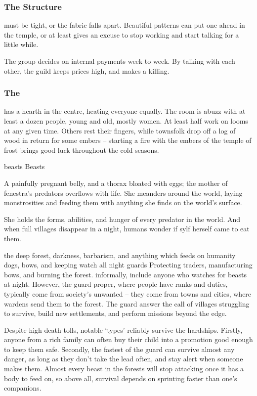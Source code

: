 \begin{multicols}{2}
\subsubsection{The Structure}
must be tight, or the fabric falls apart.
Beautiful patterns can put one ahead in the temple, or at least gives an excuse to stop working and start talking for a little while.

The group decides on internal payments week to week.
By talking with each other, the guild keeps prices high, and makes a killing.

\subsubsection{The }
has a hearth in the centre, heating everyone equally.
The room is abuzz with at least a dozen people, young and old, mostly women.
At least half work on looms at any given time.
Others rest their fingers, while townsfolk drop off a log of wood in return for some embers -- starting a fire with the embers of the temple of frost brings good luck throughout the cold seasons.


  {\gls{beasts}}%
  {Beasts}%
  {%
    A painfully pregnant belly, and a thorax bloated with eggs; the mother of \gls{fenestra}'s predators overflows with life.
    She meanders around the world, laying monstrosities and feeding them with anything she finds on the world's surface.

    She holds the forms, abilities, and hunger of every predator in the world.
    And when full \glspl{village} disappear in a night, humans wonder if \gls{sylf} herself came to eat them.
  }%
  {the deep forest, darkness, barbarism, and anything which feeds on humanity}%
  {dogs, bows, and keeping watch all night}%
  {\Glspl{guard}}%
  {
    Protecting traders, manufacturing bows, and burning the forest.
  }%
informally, include anyone who watches for beasts at night.
However, the \gls{guard} proper, where people have ranks and duties, typically come from society's unwanted -- they come from towns and cities, where \glspl{warden} send them to the forest.
The \gls{guard} answer the call of \glspl{village} struggling to survive, build new settlements, and perform missions beyond the \gls{edge}.

Despite high death-tolls, notable `types' reliably survive the hardships.
Firstly, anyone from a rich family can often buy their child into a promotion good enough to keep them safe.
Secondly, the fastest of the \gls{guard} can survive almost any danger, as long as they don't take the lead often, and stay alert when someone makes them.
Almost every beast in the forests will stop attacking once it has a body to feed on, so above all, survival depends on sprinting faster than one's companions.


\end{multicols}
